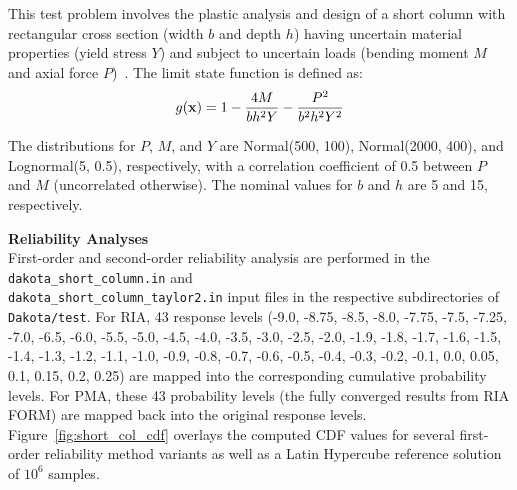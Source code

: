 This test problem involves the plastic analysis and design of a short
column with rectangular cross section (width $b$ and depth $h$) having
uncertain material properties (yield stress $Y$) and subject to
uncertain loads (bending moment $M$ and axial force $P$)~\cite{Kus97}.
The limit state function is defined as:
\begin{equation}
g({\bf x}) = 1 - \frac{4M}{b h^2 Y} - \frac{P^2}{b^2 h^2 Y^2}
\end{equation}

The distributions for $P$, $M$, and $Y$ are Normal(500, 100),
Normal(2000, 400), and Lognormal(5, 0.5), respectively, with a
correlation coefficient of 0.5 between $P$ and $M$ (uncorrelated
otherwise). The nominal values for $b$ and $h$ are 5 and 15,
respectively.

{\bf Reliability Analyses} \\

First-order and second-order reliability analysis are performed in the
\texttt{dakota\_short\_column.in} and \\
\texttt{dakota\_short\_column\_taylor2.in} input files in the respective 
subdirectories of {\tt Dakota/test}. For RIA, 43 response levels (-9.0, -8.75,
-8.5, -8.0, -7.75, -7.5, -7.25, -7.0, -6.5, -6.0, -5.5, -5.0, -4.5,
-4.0, -3.5, -3.0, -2.5, -2.0, -1.9, -1.8, -1.7, -1.6, -1.5, -1.4,
-1.3, -1.2, -1.1, -1.0, -0.9, -0.8, -0.7, -0.6, -0.5, -0.4, -0.3,
-0.2, -0.1, 0.0, 0.05, 0.1, 0.15, 0.2, 0.25) are mapped into the
corresponding cumulative probability levels. For PMA, these 43
probability levels (the fully converged results from RIA FORM) are
mapped back into the original response levels.
Figure~\ref{fig:short_col_cdf} overlays the computed CDF values for
several first-order reliability method variants as well as a Latin
Hypercube reference solution of $10^6$ samples.

